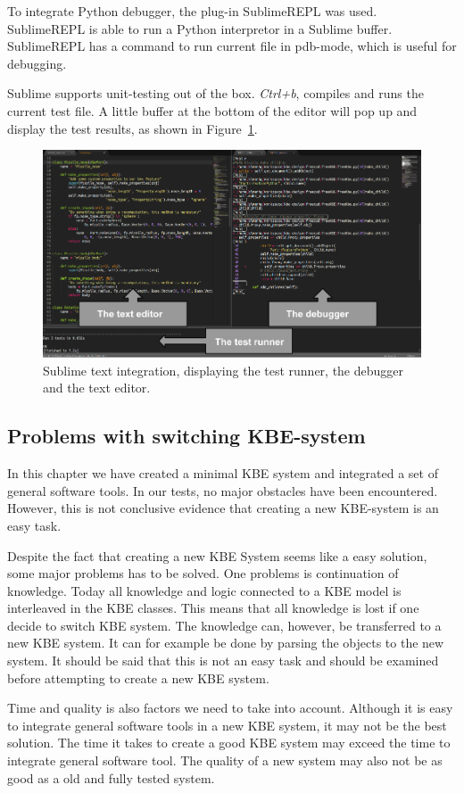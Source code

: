 To integrate Python debugger, the plug-in SublimeREPL was used. SublimeREPL is able to run a Python interpretor in a Sublime buffer. SublimeREPL has a command to run current file in pdb-mode, which is useful for debugging.

Sublime supports unit-testing out of the box. \textit{Ctrl+b}, compiles and runs the current test file. A little buffer at the bottom of the editor will pop up and display the test results, as shown in Figure~\ref{fig:sublime_ide}.

\begin{figure}[ht!]
\centering
\includegraphics[width=120mm]{gfx/sublime_ide_arrows.png}

\caption{Sublime text integration, displaying the test runner, the debugger and the text editor.}
\label{fig:sublime_ide}
\end{figure}


\subsection{Problems with switching KBE-system} %
\label{sub:problems_with_switching_KBE_system}
In this chapter we have created a minimal KBE system and integrated a set of general software tools. In our tests, no major obstacles have been encountered. However, this is not conclusive evidence that creating a new KBE-system is an easy task.

Despite the fact that creating a new KBE System seems like a easy solution, some major problems has to be solved. One problems is continuation of knowledge. Today all knowledge and logic connected to a KBE model is interleaved in the KBE classes. This means that all knowledge is lost if one decide to switch KBE system. The knowledge can, however, be transferred to a new KBE system. It can for example be done by parsing the objects to the new system. It should be said that this is not an easy task and should be examined before attempting to create a new KBE system.

Time and quality is also factors we need to take into account. Although it is easy to integrate general software tools in a new KBE system, it may not be the best solution. The time it takes to create a good KBE system may exceed the time to integrate general software tool. The quality of a new system may also not be as good as a old and fully tested system.
